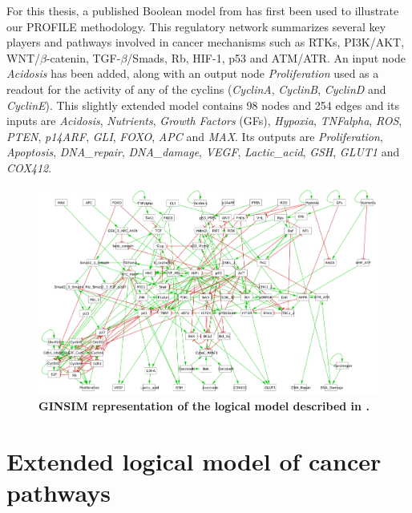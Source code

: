 \documentclass[a4paper,12pt,twoside,onecolumn,openright,final,oldfontcommands]{memoir}
\begin{document}
For this thesis, a published Boolean model from \citep{fumia2013boolean}
has first been used to illustrate our PROFILE methodology. This
regulatory network summarizes several key players and pathways involved
in cancer mechanisms such as RTKs, PI3K/AKT, WNT/\(\beta\)-catenin,
TGF-\(\beta\)/Smads, Rb, HIF-1, p53 and ATM/ATR. An input node
\emph{Acidosis} has been added, along with an output node
\emph{Proliferation} used as a readout for the activity of any of the
cyclins (\emph{CyclinA}, \emph{CyclinB}, \emph{CyclinD} and
\emph{CyclinE}). This slightly extended model contains 98 nodes and 254
edges and its inputs are \emph{Acidosis}, \emph{Nutrients}, \emph{Growth
Factors} (GFs), \emph{Hypoxia}, \emph{TNFalpha}, \emph{ROS},
\emph{PTEN}, \emph{p14ARF}, \emph{GLI}, \emph{FOXO}, \emph{APC} and
\emph{MAX}. Its outputs are \emph{Proliferation}, \emph{Apoptosis},
\emph{DNA\_repair}, \emph{DNA\_damage}, \emph{VEGF},
\emph{Lactic\_acid}, \emph{GSH}, \emph{GLUT1} and \emph{COX412}.

\begin{figure}

{\centering \includegraphics[width=0.9\linewidth]{fig/Fumia2013} 

}

\caption[Graphical abstract of PROFILE method to personalize logical models with omics data]{\textbf{GINSIM representation of the logical model
described in \citet{fumia2013boolean}.}}\label{fig:Fumia}
\end{figure}




\section{Extended logical model of cancer
pathways}\label{appendix-verlingue}
\end{document}
